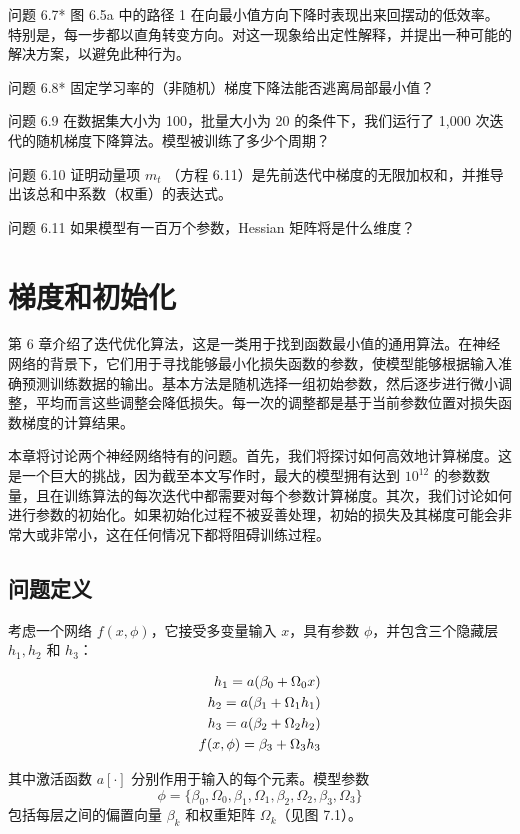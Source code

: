 \documentclass[lang=cn,newtx,10pt,scheme=chinese]{elegantbook}
\begin{document}
问题 6.7* 图 6.5a 中的路径 1 在向最小值方向下降时表现出来回摆动的低效率。特别是，每一步都以直角转变方向。对这一现象给出定性解释，并提出一种可能的解决方案，以避免此种行为。

问题 6.8* 固定学习率的（非随机）梯度下降法能否逃离局部最小值？

问题 6.9 在数据集大小为 100，批量大小为 20 的条件下，我们运行了 1,000 次迭代的随机梯度下降算法。模型被训练了多少个周期？

问题 6.10 证明动量项 \(m_t\) （方程 6.11）是先前迭代中梯度的无限加权和，并推导出该总和中系数（权重）的表达式。

问题 6.11 如果模型有一百万个参数，Hessian 矩阵将是什么维度？

\chapter{梯度和初始化}
第 6 章介绍了迭代优化算法，这是一类用于找到函数最小值的通用算法。在神经网络的背景下，它们用于寻找能够最小化损失函数的参数，使模型能够根据输入准确预测训练数据的输出。基本方法是随机选择一组初始参数，然后逐步进行微小调整，平均而言这些调整会降低损失。每一次的调整都是基于当前参数位置对损失函数梯度的计算结果。

本章将讨论两个神经网络特有的问题。首先，我们将探讨如何高效地计算梯度。这是一个巨大的挑战，因为截至本文写作时，最大的模型拥有达到 $10^12$ 的参数数量，且在训练算法的每次迭代中都需要对每个参数计算梯度。其次，我们讨论如何进行参数的初始化。如果初始化过程不被妥善处理，初始的损失及其梯度可能会非常大或非常小，这在任何情况下都将阻碍训练过程。
\section{问题定义}
考虑一个网络 \(f(x, \phi)\)，它接受多变量输入 \(x\)，具有参数 \(\phi\)，并包含三个隐藏层 \(h_1, h_2\) 和 \(h_3\)：


\begin{align}
h_1 = a(\beta_0 + \Omega_0x) \notag \\
h_2 = a(\beta_1 + \Omega_1h_1) \notag \\
h_3 = a(\beta_2 + \Omega_2h_2) \notag \\
f(x, \phi) = \beta_3 + \Omega_3h_3 
\end{align} 


其中激活函数 \(a[\cdot]\) 分别作用于输入的每个元素。模型参数 
\begin{equation*}
\phi = \{\beta_0,\Omega_0,\beta_1,\Omega_1,\beta_2,\Omega_2,\beta_3,\Omega_3\}    
\end{equation*}
包括每层之间的偏置向量 \(\beta_k\) 和权重矩阵 \(\Omega_k\)（见图 7.1）。
\end{document}
